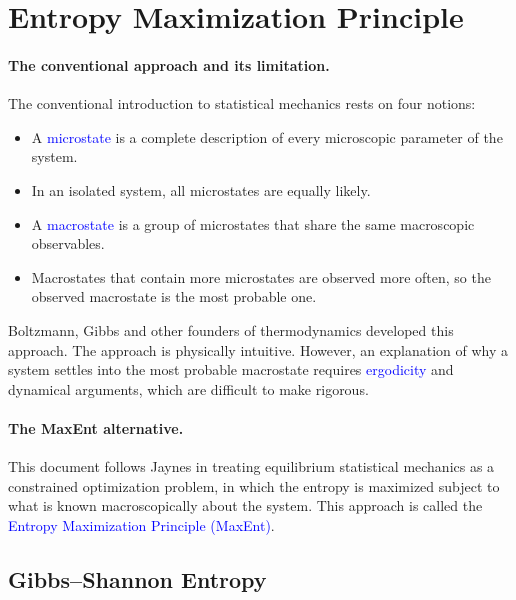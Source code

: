 \section{Entropy Maximization Principle}

\paragraph{The conventional approach and its limitation.}
The conventional introduction to statistical mechanics rests on four notions:
\begin{itemize}
    \item A \textcolor{blue}{microstate} is a complete description of every
    microscopic parameter of the system.
    \item In an isolated system, all microstates are equally likely.
    \item A \textcolor{blue}{macrostate} is a group of microstates that share
    the same macroscopic observables.
    \item Macrostates that contain more microstates are observed more often,
    so the observed macrostate is the most probable one.
\end{itemize}
Boltzmann, Gibbs and other founders of thermodynamics developed this
approach. The approach is physically intuitive. However, an explanation of
why a system settles into the most probable macrostate requires
\textcolor{blue}{ergodicity} and dynamical arguments, which are difficult to
make rigorous.

\paragraph{The MaxEnt alternative.}
This document follows Jaynes in treating equilibrium statistical mechanics
as a constrained optimization problem, in which the entropy is maximized
subject to what is known macroscopically about the system. This approach is
called the \textcolor{blue}{Entropy Maximization Principle (MaxEnt)}.

\subsection{Gibbs--Shannon Entropy}

